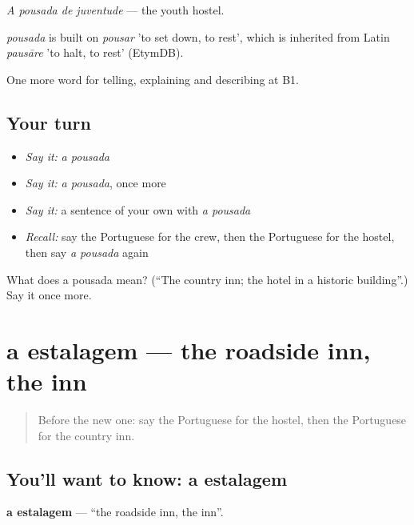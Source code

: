 \emph{A pousada de juventude} — the youth hostel.

\begin{cousinweb}
\emph{pousada} is built on \emph{pousar} 'to set down, to rest', which is inherited from Latin \emph{pausāre} 'to halt, to rest' (EtymDB).
\end{cousinweb}

\begin{grammarlens}[title={What you've built}]
One more word for telling, explaining and describing at B1.
\end{grammarlens}

\subsection*{Your turn}
\begin{itemize}
\raggedright
  \item \emph{Say it:} \emph{a pousada}
  \item \emph{Say it:} \emph{a pousada}, once more
  \item \emph{Say it:} a sentence of your own with \emph{a pousada}
  \item \emph{Recall:} say the Portuguese for the crew, then the Portuguese for the hostel, then say \emph{a pousada} again
\end{itemize}

\begin{tcolorbox}[breakable,colback=teal!4,colframe=teal!35!black,title={Before you move on}]
What does a pousada mean? (\textquotedblleft{}The country inn; the hotel in a historic building\textquotedblright{}.) Say it once more.
\end{tcolorbox}
\section[a estalagem]{a estalagem — the roadside inn, the inn}

\label{lesson:PT-C425-estalagem}



\begin{quote}
Before the new one: say the Portuguese for the hostel, then the Portuguese for the country inn.
\end{quote}

\subsection*{You'll want to know: a estalagem}
\textbf{a estalagem} — \textquotedblleft{}the roadside inn, the inn\textquotedblright{}.

